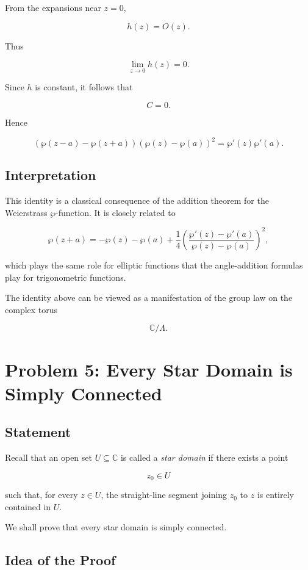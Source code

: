 \documentclass[12pt,a4paper]{article}
\theoremstyle{notespace}
\begin{document}
From the expansions near \(z=0\),

\[
h(z)=O(z).
\]

Thus

\[
\lim_{z\to 0} h(z)=0.
\]

Since \(h\) is constant, it follows that

\[
C=0.
\]

Hence

\[
\boxed{
	(\wp(z-a)-\wp(z+a))
	(\wp(z)-\wp(a))^2
	=
	\wp'(z)\wp'(a)
}.
\]

\subsection{Interpretation}

This identity is a classical consequence of the addition theorem for the Weierstrass \(\wp\)-function. It is closely related to

\[
\wp(z+a)
=
-\wp(z)-\wp(a)
+
\frac14
\left(
\frac{\wp'(z)-\wp'(a)}
{\wp(z)-\wp(a)}
\right)^2,
\]

which plays the same role for elliptic functions that the angle-addition formulas play for trigonometric functions.

The identity above can be viewed as a manifestation of the group law on the complex torus

\[
\mathbb C/\Lambda.
\]

\section{Problem 5: Every Star Domain is Simply Connected}

\subsection{Statement}

Recall that an open set \(U\subseteq\mathbb C\) is called a \emph{star domain} if there exists a point

\[
z_0\in U
\]

such that, for every \(z\in U\), the straight-line segment joining \(z_0\) to \(z\) is entirely contained in \(U\).

We shall prove that every star domain is simply connected.

\subsection{Idea of the Proof}
\end{document}
